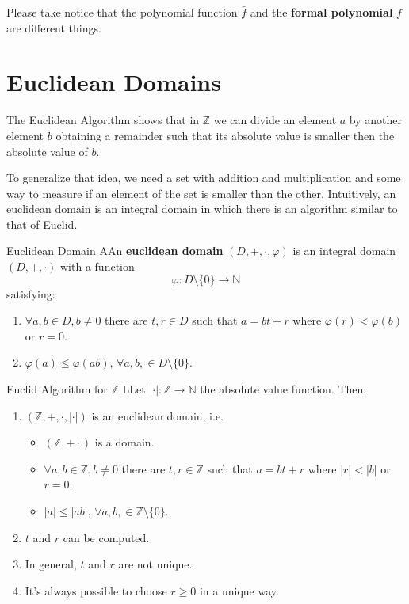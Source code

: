 \documentclass[12pt,a4paper]{article}
\begin{document}
Please take notice that the polynomial function $\bar{f}$ and the \textbf{formal polynomial} $f$ are different things.

\section{Euclidean Domains}

The Euclidean Algorithm shows that in $\mathbb{Z}$ we can divide an element $a$ by another element $b$ obtaining a remainder such that its absolute value is smaller then the absolute value of $b$. 

To generalize that idea, we need a set with addition and multiplication and some way to measure if an element of the set is smaller than the other. Intuitively, an euclidean domain is an integral domain in which there is an algorithm similar to that of Euclid.

\begin{defn}{Euclidean Domain}
AAn \textbf{euclidean domain} $(D, +, \cdot, \varphi)$ is an integral domain $(D,+,\cdot)$ with a function
\[
\varphi : D \setminus \{0 \} \to \mathbb{N}
\]
satisfying:
\begin{enumerate}
\item $\forall a,b \in D, b \neq 0$ there are $t, r \in D$ such that $a = bt+r$ where $\varphi(r) < \varphi(b)$ or $r = 0$.
\item $\varphi(a) \leq \varphi(ab), \, \forall a,b, \in D \setminus \{0\}$.
\end{enumerate}
\end{defn}

\begin{thm}{Euclid Algorithm for $\mathbb{Z}$}
LLet $ | \cdot | :  \mathbb{Z} \to \mathbb{N} $ the absolute value function. Then:
\begin{enumerate}
\item $(\mathbb{Z}, +, \cdot, | \cdot |)$ is an euclidean domain, i.e.
\begin{itemize}
\item $(\mathbb{Z}, + \cdot)$ is a domain.
\item $\forall a,b \in \mathbb{Z}, b \neq 0$ there are $t, r \in \mathbb{Z}$ such that $a = bt+r$ where $|r| < |b|$ or $r = 0$.
\item $|a| \leq |ab|, \, \forall a,b, \in \mathbb{Z} \setminus \{0\}$.
\end{itemize}
\item $t$ and $r$ can be computed.
\item In general, $t$ and $r$ are not unique.
\item It's always possible to choose $r \geq 0$ in a unique way.
\end{enumerate}
\end{thm}
\end{document}
